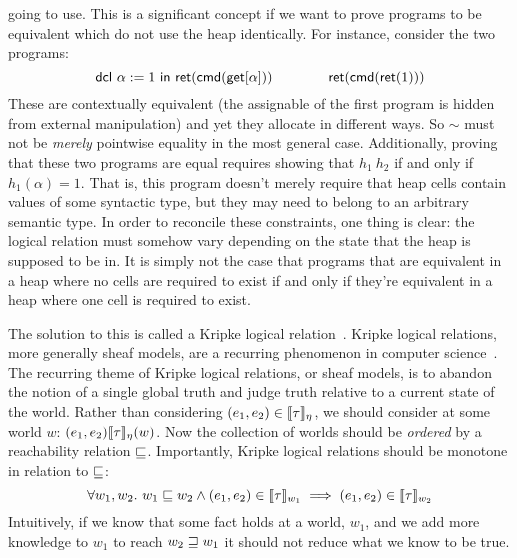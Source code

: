 going to use. This is a significant concept if we want to prove
programs to be equivalent which do not use the heap identically. For
instance, consider the two programs:
\[
  \mathsf{dcl}\ \alpha := 1\ \mathsf{in}\ \mathsf{ret}(\mathsf{cmd}(\mathsf{get}[\alpha])) \qquad\qquad
  \mathsf{ret}(\mathsf{cmd}(\mathsf{ret}(1)))
\]
These are contextually equivalent (the assignable of the first program
is hidden from external manipulation) and yet they allocate in
different ways. So $\sim$ must not be \emph{merely} pointwise equality
in the most general case. Additionally, proving that these two
programs are equal requires showing that $h_1 ~ h_2$ if and only if
$h_1(\alpha) = 1$. That is, this program doesn't merely require that
heap cells contain values of some syntactic type, but they may need to
belong to an arbitrary semantic type. In order to reconcile these
constraints, one thing is clear: the logical relation must somehow
vary depending on the state that the heap is supposed to be in. It is
simply not the case that programs that are equivalent in a heap where
no cells are required to exist if and only if they're equivalent in a
heap where one cell is required to exist.

The solution to this is called a Kripke logical
relation~\citep{TODO-KRIPKE}. Kripke logical relations, more generally
sheaf models, are a recurring phenomenon in computer
science~\citep{TODO-KRIPKE-STUFF}. The recurring theme of Kripke
logical relations, or sheaf models, is to abandon the notion of a
single global truth and judge truth relative to a current state of the
world. Rather than considering $(e_1, e_2) \in \llbracket \tau \rrbracket_\eta$, we
should consider at some world $w$: $(e_1, e_2)
\llbracket \tau \rrbracket_\eta(w)$. Now the collection of worlds should be
\emph{ordered} by a reachability relation $\mathrel{\sqsubseteq}$. Importantly,
Kripke logical relations should be monotone in relation to $\mathrel{\sqsubseteq}$:
\[
  \forall w_1, w_2.
  \ w_1 \mathrel{\sqsubseteq} w_2 \land (e_1, e_2) \in \llbracket \tau \rrbracket_{w_1}
  \implies (e_1, e_2) \in \llbracket \tau \rrbracket_{w_2}
\]
Intuitively, if we know that some fact holds at a world, $w_1$, and we
add more knowledge to $w_1$ to reach $w_2 \mathrel{\sqsupseteq} w_1$ it should not
reduce what we know to be true.

